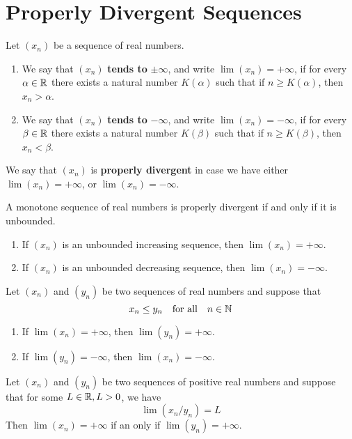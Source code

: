 \section{Properly Divergent Sequences}

\begin{definition}
	Let $(x_n)$ be a sequence of real numbers.
	\begin{enumerate}
		\item We say that $(x_n)$ \textbf{tends to} $\pm \infty$, and write $\lim (x_n) = +\infty$, if for every $\alpha \in \mathbb{R}$ there exists a natural number $K(\alpha)$ such that if $n \geq K(\alpha)$, then $x_n > \alpha$.

		\item We say that $(x_n)$ \textbf{tends to} $-\infty$, and write $\lim (x_n) = -\infty$, if for every $\beta \in \mathbb{R}$ there exists a natural number $K(\beta)$ such that if $n \geq K(\beta)$, then $x_n <  \beta$.
	\end{enumerate}
	We say that $(x_n)$ is \textbf{properly divergent} in case we have either $\lim (x_n)=+\infty$, or $\lim (x_n)=-\infty$.
\end{definition}

\begin{theorem}
	A monotone sequence of real numbers is properly divergent if and only if it is unbounded.
	\begin{enumerate}
		\item If $(x_n)$ is an unbounded increasing sequence, then $\lim (x_n)=+\infty$.
		\item If $(x_n)$ is an unbounded decreasing sequence, then $\lim (x_n) = -\infty$.
	\end{enumerate}
\end{theorem}

\begin{theorem}
	Let $(x_n)$ and $(y_n)$ be two sequences of real numbers and suppose that
	\[x_n \leq y_n\ \ \ \text{for all}\ \ \ n \in \mathbb{N}\]
	\begin{enumerate}
		\item If $\lim (x_n) = +\infty$, then $\lim (y_n)=+\infty$.
		\item If $\lim (y_n) = -\infty$, then $\lim (x_n)=-\infty$.
	\end{enumerate}
\end{theorem}

\begin{theorem}
	Let $(x_n)$ and $(y_n)$ be two sequences of positive real numbers and suppose that for some $L \in \mathbb{R}, L>0$, we have
	\[\lim (x_n/y_n)=L\]
	Then $\lim (x_n)=+\infty$ if an only if $\lim (y_n)=+\infty$.
\end{theorem}
